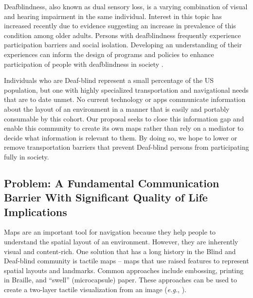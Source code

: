 


\begin{myquoting}{\cite{jaiswal2018participation}}

Deafblindness, also known as dual sensory loss, is a varying combination of visual and
hearing impairment in the same individual. Interest in this topic has increased recently due
to evidence suggesting an increase in prevalence of this condition among older adults. Persons with deafblindness frequently experience participation barriers and social isolation. Developing an understanding of their experiences can inform the design of programs and
policies to enhance participation of people with deafblindness in society .
\end{myquoting}

Individuals who are Deaf-blind represent a small percentage of the US population, but one with highly specialized transportation and navigational needs that are to date unmet. No current technology or apps communicate information about the layout of an environment in a manner that is easily and portably consumable by this cohort. Our proposal seeks to close this information gap and enable this community to create its own maps rather than rely on a mediator to decide what information is relevant to them. By doing so, we hope to lower or remove transportation barriers that prevent Deaf-blind persons from participating fully in society. 

\subsection{Problem: A Fundamental Communication Barrier With Significant Quality of Life Implications}

Maps are an important tool for navigation because they help people to understand the spatial layout of an environment. However, they are inherently visual and content-rich. One solution that has a long history in the Blind and Deaf-blind community is tactile maps – maps that use raised features to represent spatial layouts and landmarks. Common approaches include embossing, printing in Braille, and “swell” (microcapsule) paper. These approaches can be used to create a two-layer tactile visualization from an image (\textit{e.g.}, \cite{miele2006talking}).

